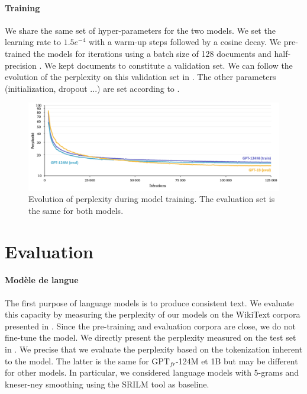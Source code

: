 \paragraph{Training} We share the same set of hyper-parameters for the two models. We set the learning rate to $1.5e^{-4}$ with a  warm-up steps followed by a cosine decay. We pre-trained the models for  iterations using a batch size of 128 documents and half-precision \parencite{micikevicius_18}. We kept  documents to constitute a validation set. We can follow the evolution of the perplexity on this validation set in . The other parameters (initialization, dropout ...) are set according to \textcite{radford_2018}.

\begin{figure}[htbp]
\begin{center}
\includegraphics[width=16cm]{images/ppl-training-5.png}
\end{center}
\caption{Evolution of perplexity during model training. The evaluation set is the same for both models.}
\end{figure}

\section{Evaluation}

\paragraph{Modèle de langue} The first purpose of language models is to produce consistent text. We evaluate this capacity by measuring the perplexity of our models on the WikiText corpora presented in . Since the pre-training and evaluation corpora are close, we do not fine-tune the model. We directly present the perplexity measured on the test set in . We precise that we evaluate the perplexity based on the tokenization inherent to the model. The latter is the same for $\text{GPT}_{fr}$-124M et 1B but may be different for other models. In particular, we considered language models with 5-grams and kneser-ney smoothing \parencite{ney_94} using the SRILM tool \parencite{stolcke_02} as baseline.

